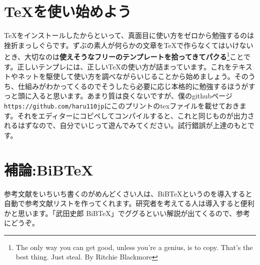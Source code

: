 \documentclass[a4paper]{jarticle}
\begin{document}
\section{\TeX を使い始めよう}
\TeX をインストールしたからといって、真面目に使い方をゼロから勉強するのは挫折まっしぐらです。ずぶの素人が何らかの文章を\TeX で作らなくてはいけないとき、大切なのは{\bf 使えそうなフリーのテンプレートを拾ってきてパクる}\footnote{The only way you can get good, unless you're a genius, is to copy. That's the best thing. Just steal. By Ritchie Blackmore}ことです。正しいテンプレには、正しい\TeX の使い方が詰まっています。これをテキストやネットを駆使して使い方を調べながらいじることから始めましょう。そのうち、仕組みがわかってくるのでそうしたら必要に応じ本格的に勉強するほうがすっと頭に入ると思います。あまり質は良くないですが、僕のgithubページ\verb|https://github.com/haru110jp|にこのプリントのtexファイルを載せておきます。それをエディターにコピペしてコンパイルすると、これと同じものが出力されるはずなので、自分でいじって遊んでみてください。試行錯誤が上達のもとです。

\section{補論:BiBTeX}
参考文献をいちいち書くのがめんどくさい人は、BiBTeXというのを導入すると自動で参考文献リストを作ってくれます。研究者を考えてる人は導入すると便利かと思います。「武田史郎 BiBTeX」でググるといい解説が出てくるので、参考にどうぞ。
\end{document}
